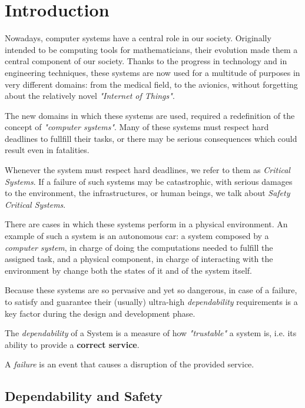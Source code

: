 \chapter{Introduction}

Nowadays, computer systems have a central role in our society. Originally intended to be computing tools for mathematicians, their evolution made them a central component of our society. Thanks to the progress in technology and in engineering techniques, these systems are now used for a multitude of purposes in very different domains: from the medical field, to the avionics, without forgetting about the relatively novel \textsl{"Internet of Things"}.

The new domains in which these systems are used, required a redefinition of the concept of \textsl{"computer systems"}. Many of these systems must respect hard deadlines to fullfill their tasks, or there may be serious consequences which could result even in fatalities.

Whenever the system must respect hard deadlines, we refer to them as \textsl{Critical Systems}. If a failure of such systems may be catastrophic, with serious damages to the environment, the infrastructures, or human beings, we talk about \textsl{Safety Critical Systems}.\cite{safety-critical}

There are cases in which these systems perform in a physical environment. An example of such a system is an autonomous car: a system composed by a \textsl{computer system}, in charge of doing the computations needed to fulfill the assigned task, and a physical component, in charge of interacting with the environment by change both the states of it and of the system itself.

Because these systems are so pervasive and yet so dangerous, in case of a failure, to satisfy and guarantee their (usually) ultra-high \textsl{dependability} requirements is a key factor during the design and development phase.

The \textsl{dependability} of a System is a measure of how \textsl{"trustable"} a system is, i.e. its ability to provide a \textbf{correct service}.\cite{dependabilitypaper}

A \textsl{failure} is an event that causes a disruption of the provided service.

\section{Dependability and Safety}

